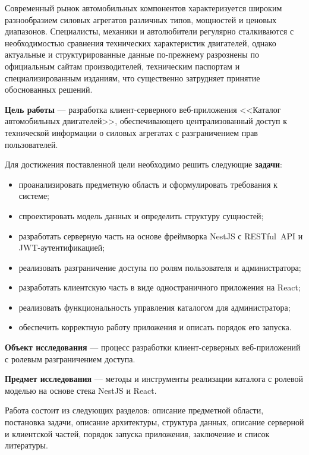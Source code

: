 \documentclass[14pt,a4paper]{extarticle}
\begin{document}
Современный рынок автомобильных компонентов характеризуется широким разнообразием силовых агрегатов различных типов, мощностей и ценовых диапазонов. Специалисты, механики и автолюбители регулярно сталкиваются с необходимостью сравнения технических характеристик двигателей, однако актуальные и структурированные данные по-прежнему разрознены по официальным сайтам производителей, техническим паспортам и специализированным изданиям, что существенно затрудняет принятие обоснованных решений.

\textbf{Цель работы} --- разработка клиент-серверного веб-приложения <<Каталог автомобильных двигателей>>, обеспечивающего централизованный доступ к технической информации о силовых агрегатах с разграничением прав пользователей.

Для достижения поставленной цели необходимо решить следующие \textbf{задачи}:
\begin{itemize}
  \item проанализировать предметную область и сформулировать требования к системе;
  \item спроектировать модель данных и определить структуру сущностей;
  \item разработать серверную часть на основе фреймворка NestJS с RESTful~API и JWT-аутентификацией;
  \item реализовать разграничение доступа по ролям пользователя и администратора;
  \item разработать клиентскую часть в виде одностраничного приложения на React;
  \item реализовать функциональность управления каталогом для администратора;
  \item обеспечить корректную работу приложения и описать порядок его запуска.
\end{itemize}

\textbf{Объект исследования} --- процесс разработки клиент-серверных веб-приложений с ролевым разграничением доступа.

\textbf{Предмет исследования} --- методы и инструменты реализации каталога с ролевой моделью на основе стека NestJS и React.

Работа состоит из следующих разделов: описание предметной области, постановка задачи, описание архитектуры, структура данных, описание серверной и клиентской частей, порядок запуска приложения, заключение и список литературы.

\newpage

\end{document}

